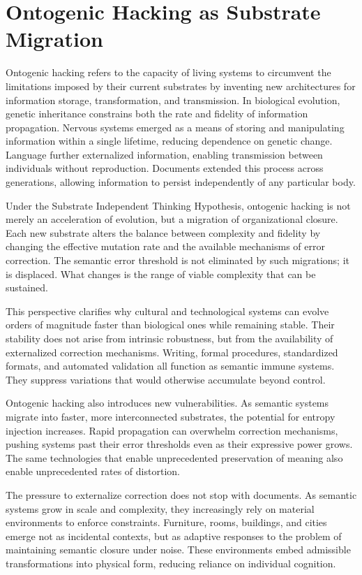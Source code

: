 \documentclass[11pt,oneside]{article}
\begin{document}
\section{Ontogenic Hacking as Substrate Migration}

Ontogenic hacking refers to the capacity of living systems to circumvent the limitations imposed by their current substrates by inventing new architectures for information storage, transformation, and transmission. In biological evolution, genetic inheritance constrains both the rate and fidelity of information propagation. Nervous systems emerged as a means of storing and manipulating information within a single lifetime, reducing dependence on genetic change. Language further externalized information, enabling transmission between individuals without reproduction. Documents extended this process across generations, allowing information to persist independently of any particular body.

Under the Substrate Independent Thinking Hypothesis, ontogenic hacking is not merely an acceleration of evolution, but a migration of organizational closure. Each new substrate alters the balance between complexity and fidelity by changing the effective mutation rate and the available mechanisms of error correction. The semantic error threshold is not eliminated by such migrations; it is displaced. What changes is the range of viable complexity that can be sustained.

This perspective clarifies why cultural and technological systems can evolve orders of magnitude faster than biological ones while remaining stable. Their stability does not arise from intrinsic robustness, but from the availability of externalized correction mechanisms. Writing, formal procedures, standardized formats, and automated validation all function as semantic immune systems. They suppress variations that would otherwise accumulate beyond control.

Ontogenic hacking also introduces new vulnerabilities. As semantic systems migrate into faster, more interconnected substrates, the potential for entropy injection increases. Rapid propagation can overwhelm correction mechanisms, pushing systems past their error thresholds even as their expressive power grows. The same technologies that enable unprecedented preservation of meaning also enable unprecedented rates of distortion.

The pressure to externalize correction does not stop with documents. As semantic systems grow in scale and complexity, they increasingly rely on material environments to enforce constraints. Furniture, rooms, buildings, and cities emerge not as incidental contexts, but as adaptive responses to the problem of maintaining semantic closure under noise. These environments embed admissible transformations into physical form, reducing reliance on individual cognition.
\end{document}
